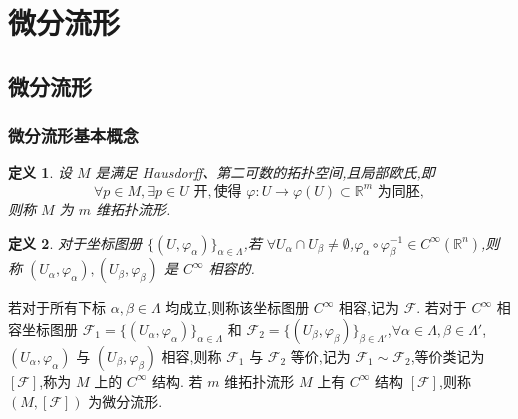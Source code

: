 \newtheorem{definition}{定义}
\newtheorem{theorem}{定理}
\newtheorem{lemma}{引理}
\newtheorem{proposition}{命题}
\newtheorem{corollary}{推论}
\newtheorem{remark}{注}
\newtheorem{example}{例}

\section{微分流形}

\subsection{微分流形}

\subsubsection{微分流形基本概念}

\begin{definition}
设 $M$ 是满足 Hausdorff、第二可数的拓扑空间,且局部欧氏,即  
\[
\forall p \in M, \exists p \in U \text{ 开}, \text{使得 } \varphi : U \to \varphi(U) \subset \mathbb{R}^m \text{ 为同胚},
\]
则称 $M$ 为 $m$ 维拓扑流形.
\end{definition}

\begin{definition}
对于坐标图册 $\{(U, \varphi_\alpha)\}_{\alpha \in \Lambda}$,若 $\forall U_\alpha \cap U_\beta \neq \emptyset$,$\varphi_\alpha \circ \varphi_\beta^{-1} \in C^\infty(\mathbb{R}^n)$,则称 $(U_\alpha, \varphi_\alpha), (U_\beta, \varphi_\beta)$ 是 $C^\infty$ 相容的.
\end{definition}

若对于所有下标 $\alpha, \beta \in \Lambda$ 均成立,则称该坐标图册 $C^\infty$ 相容,记为 $\mathcal{F}$.  
若对于 $C^\infty$ 相容坐标图册 $\mathcal{F}_1 = \{(U_\alpha, \varphi_\alpha)\}_{\alpha \in \Lambda}$ 和 $\mathcal{F}_2 = \{(U_\beta, \varphi_\beta)\}_{\beta \in \Lambda'}$,$\forall \alpha \in \Lambda, \beta \in \Lambda'$,$(U_\alpha, \varphi_\alpha)$ 与 $(U_\beta, \varphi_\beta)$ 相容,则称 $\mathcal{F}_1$ 与 $\mathcal{F}_2$ 等价,记为 $\mathcal{F}_1 \sim \mathcal{F}_2$,等价类记为 $[\mathcal{F}]$,称为 $M$ 上的 $C^\infty$ 结构.  
若 $m$ 维拓扑流形 $M$ 上有 $C^\infty$ 结构 $[\mathcal{F}]$,则称 $(M,[\mathcal{F}])$ 为微分流形.

